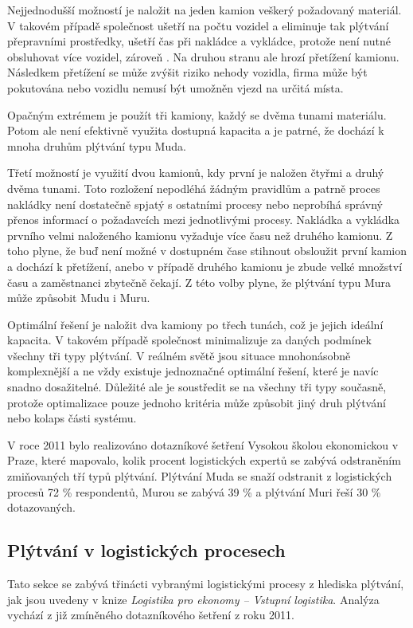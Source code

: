 Nejjednodušší možností je naložit na jeden kamion veškerý požadovaný materiál. V takovém případě společnost ušetří na počtu vozidel a eliminuje tak plýtvání přepravními prostředky, ušetří čas při nakládce a vykládce, protože není nutné obsluhovat více vozidel, zároveň . Na druhou stranu ale hrozí přetížení kamionu. Následkem přetížení se může zvýšit riziko nehody vozidla, firma může být pokutována nebo vozidlu nemusí být umožněn vjezd na určitá místa.

Opačným extrémem je použít tři kamiony, každý se dvěma tunami materiálu. Potom ale není efektivně využita dostupná kapacita a je patrné, že dochází k mnoha druhům plýtvání typu Muda.

Třetí možností je využití dvou kamionů, kdy první je naložen čtyřmi a druhý dvěma tunami. Toto rozložení nepodléhá žádným pravidlům a patrně proces nakládky není dostatečně spjatý s ostatními procesy nebo neprobíhá správný přenos informací o požadavcích mezi jednotlivými procesy. Nakládka a vykládka prvního velmi naloženého kamionu vyžaduje více času než druhého kamionu. Z toho plyne, že buď není možné v dostupném čase stihnout obsloužit první kamion a dochází k přetížení, anebo v případě druhého kamionu je zbude velké množství času a zaměstnanci zbytečně čekají. Z této volby plyne, že plýtvání typu Mura může způsobit Mudu i Muru.\cite{bib:LW3}

Optimální řešení je naložit dva kamiony po třech tunách, což je jejich ideální kapacita. V takovém případě společnost minimalizuje za daných podmínek všechny tři typy plýtvání. V reálném světě jsou situace mnohonásobně komplexnější a ne vždy existuje jednoznačné optimální řešení, které je navíc snadno dosažitelné. Důležité ale je soustředit se na všechny tři typy současně, protože optimalizace pouze jednoho kritéria může způsobit jiný druh plýtvání nebo kolaps části systému. 

V roce 2011 bylo realizováno dotazníkové šetření Vysokou školou ekonomickou v Praze, které mapovalo, kolik procent logistických expertů se zabývá odstraněním zmiňovaných tří typů plýtvání. Plýtvání Muda se snaží odstranit z logistických procesů 72 \% respondentů, Murou se zabývá 39 \% a plýtvání Muri řeší 30 \% dotazovaných.\cite{bib:Jirsak}

\subsection{Plýtvání v logistických procesech}

Tato sekce se zabývá třinácti vybranými logistickými procesy z hlediska plýtvání, jak jsou uvedeny v knize \emph{Logistika pro ekonomy -- Vstupní logistika}. Analýza vychází z již zmíněného dotazníkového šetření z roku 2011.